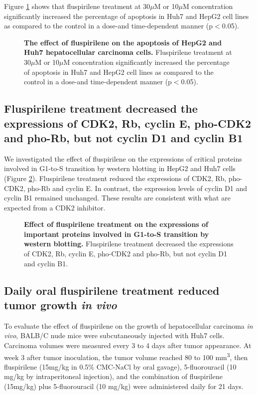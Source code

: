 \documentclass[10pt,letterpaper]{article}
\begin{document}
Figure \ref{CellApoptosisAgainstTime} shows that fluspirilene treatment at 30$\mu$M or 10$\mu$M concentration significantly increased the percentage of apoptosis in Huh7 and HepG2 cell lines as compared to the control in a dose-and time-dependent manner (p$<$0.05).

\begin{figure}%
\caption{{\bf The effect of fluspirilene on the apoptosis of HepG2 and Huh7 hepatocellular carcinoma cells.} Fluspirilene treatment at 30$\mu$M or 10$\mu$M concentration significantly increased the percentage of apoptosis in Huh7 and HepG2 cell lines as compared to the control in a dose-and time-dependent manner (p$<$0.05).}
\label{CellApoptosisAgainstTime}
\end{figure}

\subsection*{Fluspirilene treatment decreased the expressions of CDK2, Rb, cyclin E, pho-CDK2 and pho-Rb, but not cyclin D1 and cyclin B1}

We investigated the effect of fluspirilene on the expressions of critical proteins involved in G1-to-S transition by western blotting in HepG2 and Huh7 cells (Figure \ref{WesternBlot}). Fluspirilene treatment reduced the expressions of CDK2, Rb, pho-CDK2, pho-Rb and cyclin E. In contrast, the expression levels of cyclin D1 and cyclin B1 remained unchanged. These results are consistent with what are expected from a CDK2 inhibitor.

\begin{figure}%
\caption{{\bf Effect of fluspirilene treatment on the expressions of important proteins involved in G1-to-S transition by western blotting.} Fluspirilene treatment decreased the expressions of CDK2, Rb, cyclin E, pho-CDK2 and pho-Rb, but not cyclin D1 and cyclin B1.}
\label{WesternBlot}
\end{figure}

\subsection*{Daily oral fluspirilene treatment reduced tumor growth \textit{in vivo}}

To evaluate the effect of fluspirilene on the growth of hepatocellular carcinoma \textit{in vivo}, BALB/C nude mice were subcutaneously injected with Huh7 cells. Carcinoma volumes were measured every 3 to 4 days after tumor appearance. At week 3 after tumor inoculation, the tumor volume reached 80 to 100 mm\textsuperscript{3}, then fluspirilene (15mg/kg in 0.5\% CMC-NaCl by oral gavage), 5-fluorouracil (10 mg/kg by intraperitoneal injection), and the combination of fluspirilene (15mg/kg) plus 5-fluorouracil (10 mg/kg) were administered daily for 21 days.
\end{document}
